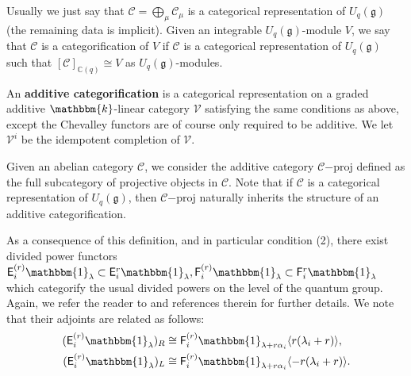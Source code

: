 \documentclass[11pt,reqno]{amsart}
\numberwithin{equation}{section}
\theoremstyle{definition}
\theoremstyle{named}
\newcommand{\cC}{\mathcal{C}}
\newcommand{\sE}{\mathsf{E}}
\newcommand{\sF}{\mathsf{F}}
\newcommand{\cV}{\mathcal{V}}
\newcommand{\fg}{\mathfrak{g}}
\newcommand{\kk}{\mathbbm{k}}
\newcommand{\CC}{\mathbb{C}}
\newcommand{\bone}{\mathbbm{1}}
\newcommand{\proj}{\mathrm{-proj}}
\begin{document}
Usually we just say that $\cC=\bigoplus_\mu \cC_\mu$ is a categorical representation of $U_q(\fg)$ (the remaining data is implicit).   Given an integrable $U_q(\fg)$-module $V$, we say that $\cC$ is a categorification of $V$ if $\cC$ is a categorical representation of $U_q(\fg)$ such that $[\cC]_{\CC(q)} \cong V$ as $U_q(\fg)$-modules.

An \textbf{additive categorification} is a categorical representation on a graded additive $\kk$-linear category $\cV$ satisfying the same conditions as above, except the Chevalley functors are of course only required to be additive.  We let $\cV^i$ be the idempotent completion of $\cV$.

Given an abelian category $\cC$, we consider the additive category $\cC\proj$ defined as the full subcategory of projective objects in $\cC$.  Note that if $\cC$ is a categorical representation of $U_q(\fg)$, then $\cC\proj$ naturally inherits the structure of an additive categorification.  



As a consequence of this definition, and in particular condition (2), there exist divided power functors $\sE_i^{(r)}\bone_\lambda \subset \sE_i^r\bone_\lambda, \sF_i^{(r)}\bone_\lambda \subset \sF_i^r\bone_\lambda$ which categorify the usual divided powers on the level of the quantum group.  Again, we refer the reader to \cite{CaLa} and references therein for further details.  We note that their adjoints are related as follows:
\begin{align}\label{eqs:biadjs}
(\sE_i^{(r)}\bone_\lambda)_R &\cong \sF_i^{(r)}\bone_{\lambda+r\alpha_i}\langle r(\lambda_i+r) \rangle,\\
(\sE_i^{(r)}\bone_\lambda)_L &\cong \sF_i^{(r)}\bone_{\lambda+r\alpha_i}\langle -r(\lambda_i+r) \rangle.
\end{align}
\end{document}
